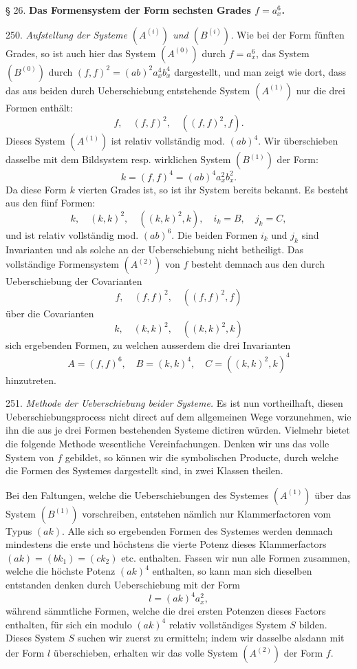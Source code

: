 \documentclass[11pt]{article}
\providecommand{\weberpage}[1]{}
\begin{document}
§ 26. \textbf{Das Formensystem der Form sechsten Grades $f = a_x^6$.}

250. \textit{Aufstellung der Systeme $(A^{(i)})$ und $(B^{(i)})$.} Wie bei
der Form fünften Grades, so ist auch hier das System $(A^{(0)})$ durch
$f = a_x^6$, das System $(B^{(0)})$ durch $(f,f)^2 = (ab)^2 a_x^4 b_x^4$
dargestellt, und man zeigt wie dort, dass das aus beiden durch
Ueberschiebung entstehende System $(A^{(1)})$ nur die drei Formen enthält:
\[
f,\quad (f,f)^2,\quad ((f,f)^2, f).
\]
Dieses System $(A^{(1)})$ ist relativ vollständig mod. $(ab)^4$. Wir
überschieben dasselbe mit dem Bildsystem resp. wirklichen System
$(B^{(1)})$ der Form:
\[
k = (f,f)^4 = (ab)^4 a_x^2 b_x^2 .
\]
Da diese Form $k$ vierten Grades ist, so ist ihr System bereits bekannt.
Es besteht aus den fünf Formen:
\[
k,\quad (k,k)^2,\quad ((k,k)^2, k),\quad i_k = B,\quad j_k = C,
\]
und ist relativ vollständig mod. $(ab)^6$. Die beiden Formen $i_k$ und
$j_k$ sind Invarianten und als solche an der Ueberschiebung nicht
betheiligt. Das vollständige Formensystem $(A^{(2)})$ von $f$ besteht
demnach aus den durch Ueberschiebung der Covarianten
\[
f,\quad (f,f)^2,\quad ((f,f)^2, f)
\]
über die Covarianten
\[
k,\quad (k,k)^2,\quad ((k,k)^2, k)
\]
sich ergebenden Formen, zu welchen ausserdem die drei Invarianten
\[
A = (f,f)^6,\quad B = (k,k)^4,\quad C = ((k,k)^2, k)^4
\]
hinzutreten.

251. \textit{Methode der Ueberschiebung beider Systeme.} Es ist nun
vortheilhaft, diesen Ueberschiebungsprocess nicht direct auf dem
allgemeinen Wege vorzunehmen, wie ihn die aus je drei Formen bestehenden
Systeme dictiren würden. Vielmehr bietet die folgende Methode wesentliche
Vereinfachungen. Denken wir uns das volle System von $f$ gebildet, so
können wir die symbolischen Producte, durch welche die Formen des
Systemes dargestellt sind, in zwei Klassen theilen.


\weberpage{276}
Bei den Faltungen, welche die Ueberschiebungen des Systemes $(A^{(1)})$
über das System $(B^{(1)})$ vorschreiben, entstehen nämlich nur
Klammerfactoren vom Typus $(ak)$. Alle sich so ergebenden Formen des
Systemes werden demnach mindestens die erste und höchstens die vierte
Potenz dieses Klammerfactors $(ak) = (bk_1) = (ck_2)$ etc. enthalten.
Fassen wir nun alle Formen zusammen, welche die höchste Potenz $(ak)^4$
enthalten, so kann man sich dieselben entstanden denken durch
Ueberschiebung mit der Form
\[
l = (ak)^4 a_x^2,
\]
während sämmtliche Formen, welche die drei ersten Potenzen dieses
Factors enthalten, für sich ein modulo $(ak)^4$ relativ vollständiges
System $S$ bilden. Dieses System $S$ suchen wir zuerst zu ermitteln;
indem wir dasselbe alsdann mit der Form $l$ überschieben, erhalten wir
das volle System $(A^{(2)})$ der Form $f$.
\end{document}
